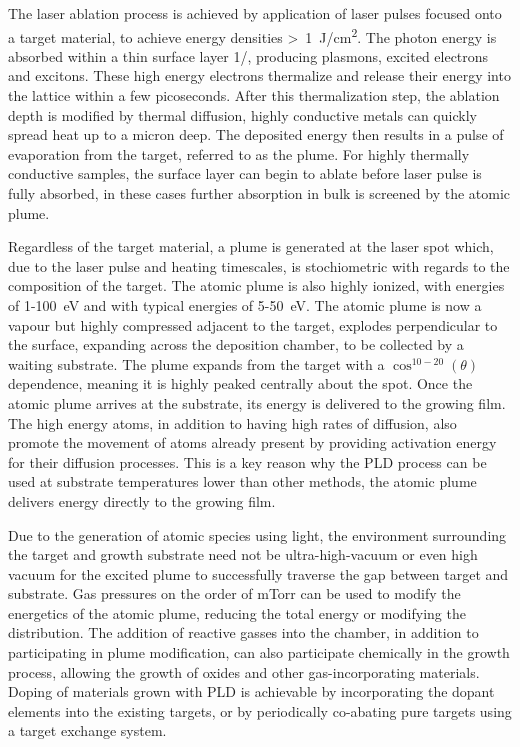 The laser ablation process is achieved by application of laser pulses focused onto a target material, to achieve energy densities >~1~J/cm\textsuperscript{2}.
The photon energy is absorbed within a thin surface layer 1/\textalpha{}, producing plasmons, excited electrons and excitons\cite{Willmott2000}.
These high energy electrons thermalize and release their energy into the lattice within a few picoseconds.
After this thermalization step, the ablation depth is modified by thermal diffusion, highly conductive metals can quickly spread heat up to a micron deep.
The deposited energy then results in a pulse of evaporation from the target, referred to as the plume.
For highly thermally conductive samples, the surface layer can begin to ablate before laser pulse is fully absorbed, in these cases further absorption in bulk is screened by the atomic plume\cite{Willmott2000}.

Regardless of the target material, a plume is generated at the laser spot which, due to the laser pulse and heating timescales, is stochiometric with regards to the composition of the target.
The atomic plume is also highly ionized, with energies of 1-100~eV and with typical energies of 5-50~eV\@. The atomic plume is now a vapour but highly compressed adjacent to the target, explodes perpendicular to the surface, expanding across the deposition chamber, to be collected by a waiting substrate.
The plume expands from the target with a \(\cos^{10-20}(\theta)\)
dependence, meaning it is highly peaked centrally about the spot.
Once the atomic plume arrives at the substrate, its energy is delivered to the growing film.
The high energy atoms, in addition to having high rates of diffusion, also promote the movement of atoms already present by providing activation energy for their diffusion processes\cite{Willmott2000}.
This is a key reason why the PLD process can be used at substrate temperatures lower than other methods, the atomic plume delivers energy directly to the growing film.

Due to the generation of atomic species using light, the environment surrounding the target and growth substrate need not be ultra-high-vacuum or even high vacuum for the excited plume to successfully traverse the gap between target and substrate.
Gas pressures on the order of mTorr can be used to modify the energetics of the atomic plume, reducing the total energy or modifying the distribution\cite{Willmott2000}.
The addition of reactive gasses into the chamber, in addition to participating in plume modification, can also participate chemically in the growth process, allowing the growth of oxides and other gas-incorporating materials.
Doping of materials grown with PLD is achievable by incorporating the dopant elements into the existing targets, or by periodically co-abating pure targets using a target exchange system.


